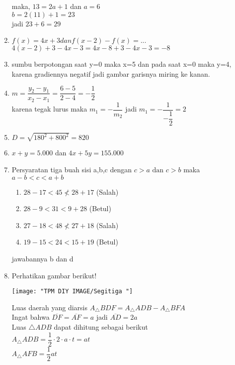 \documentclass[10pt,a4paper]{article}
\begin{document}
\begin{enumerate}
	maka, $13=2a+1$ dan $a=6$\\
		  $b=2(11)+1=23$\\
    jadi $23+6=29$
    \item $f(x)=4x+3 dan f(x-2)-f(x)=...$\\
		   $4(x-2)+3-4x-3=4x-8+3-4x-3=-8$
	\item sumbu berpotongan saat y=0 maka x=5 dan pada saat x=0 maka y=4, karena gradiennya negatif jadi gambar garisnya miring ke kanan.
	\item $m=\dfrac{y_2-y_1}{x_2-x_1}=\dfrac{6-5}{2-4}=-\dfrac{1}{2}$\\ karena tegak lurus maka $m_1=-\dfrac{1}{m_2}$ jadi $m_1=-\dfrac{1}{-\dfrac{1}{2}}=2$
	\item $D=\sqrt{180^2+800^2}=820$
	\item $x+y=5.000$ dan $4x+5y=155.000$
	\item Persyaratan tiga buah sisi a,b,c dengan $c>a \text{ dan } c>b$ maka\\
	$a-b<c<a+b$
	\begin{enumerate}
		\item $28-17<45\nless 28+17$ (Salah)
		\item $28-9<31<9+28$ (Betul)
		\item $27-18<48\nless 27+18$ (Salah)
		\item $19-15<24<15+19$ (Betul)
	\end{enumerate}
	jawabannya b dan d
	\item Perhatikan gambar berikut!
	\begin{center}
\texttt{[image: "TPM DIY IMAGE/Segitiga "]}

\end{center}
	Luas daerah yang diarsis $A_\triangle BDF=A_\triangle ADB - A_\triangle BFA$\\
	Ingat bahwa $\overline{DF}=\overline{AF}=a$ jadi $\overline{AD}=2a$\\
	Luas $\triangle ADB$ dapat dihitung sebagai berikut\\
	$A_\triangle ADB=\dfrac{1}{2}\cdot 2 \cdot a \cdot t=at$\medskip \\
	$A_\triangle AFB=\dfrac{1}{2}at$
	

\end{enumerate}
\end{document}
